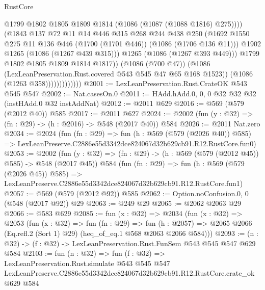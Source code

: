 \begin{lexlean}{RustCore}
\begin{coremodule}
                                    @1799
                                    @1802
                                    @1805
                                    @1809
                                    @1814
                                    (@1086 (@1087 (@1088 @1816) @275))))
                                (@1843
                                  @137
                                  @72
                                  @11
                                  @14
                                  @446
                                  @315
                                  @268
                                  @244
                                  @438
                                  @250
                                  (@1692
                                    @1550
                                    @275
                                    @11
                                    @136
                                    @446
                                    (@1700 (@1701 @446))
                                    (@1086 (@1706 @136 @11)))
                                  @1902
                                  @1265
                                  (@1086 (@1267 @439 @315)))
                                @1265
                                (@1086 (@1267 @393 @449)))
                              @1799
                              @1802
                              @1805
                              @1809
                              @1814
                              @1817))
                          (@1086 (@700 @47))
                          (@1086 (LexLeanPreservation.Rust.covered @543 @545 @47 @65 @168 @1523))
                          (@1086 (@1263 @358)))))))))))))
@2001 := LexLeanPreservation.Rust.CrateOK @543 @545 @547
@2002 := Nat.casesOn.{0}
@2011 := HAdd.hAdd.{0, 0, 0} @32 @32 @32 (instHAdd.{0} @32 instAddNat)
@2012 := @2011 @629
@2016 := @569 (@579 (@2012 @40)) @585
@2017 := @2011 @627
@2024 := @2002 (fun (y : @32) => (fn : @29) -> (h : @2016) -> @548 (@2017 @40)) @584
@2026 := @2011 Nat.zero
@2034 := @2024
    (fun (fn : @29) =>
    fun (h : @569 (@579 (@2026 @40)) @585) =>
    LexLeanPreserve.C2886e55d3342dce824067d32b629cb91.R12.RustCore.fun0)
@2053 := @2002
    (fun (y : @32) => (fn : @29) -> (h : @569 (@579 (@2012 @45)) @585) -> @548 (@2017 @45))
    @584
    (fun (fn : @29) =>
    fun (h : @569 (@579 (@2026 @45)) @585) =>
    LexLeanPreserve.C2886e55d3342dce824067d32b629cb91.R12.RustCore.fun1)
@2057 := @569 (@579 (@2012 @92)) @585
@2062 := Option.noConfusion.{0, 0} (@548 (@2017 @92)) @29
@2063 := @249 @29
@2065 := @2062 @2063 @29
@2066 := @583 @629
@2085 := fun (x : @32) =>
  @2034
    (fun (x : @32) =>
    @2053
      (fun (x : @32) =>
      fun (fn : @29) =>
      fun (h : @2057) =>
      @2065 @2066 (Eq.refl.{2} (Sort 1) @29) (heq_of_eq.{1} @568 @2063 @2066 @584)))
@2093 := (n : @32) -> (f : @32) -> LexLeanPreservation.Rust.FunSem @543 @545 @547 @629 @584
@2103 := fun (n : @32) =>
  fun (f : @32) =>
  LexLeanPreservation.Rust.simulate
    @543
    @545
    @547
    LexLeanPreserve.C2886e55d3342dce824067d32b629cb91.R12.RustCore.crate_ok
    @629
    @584
\end{coremodule}
\end{lexlean}
